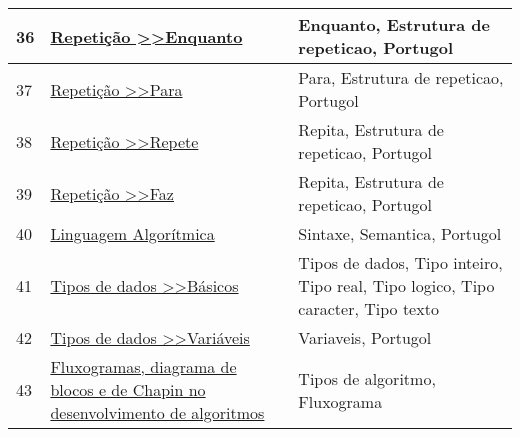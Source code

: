 \begin{longtable}{| p{} | p{} | p{} |}
36  & \href{http://www.dei.estt.ipt.pt/portugol/node/27}{\color{blue} Repetição \textgreater{}\textgreater Enquanto                                       } & Enquanto, Estrutura de repeticao, Portugol                                                                                                        \\ \hline
37  & \href{http://www.dei.estt.ipt.pt/portugol/node/28}{\color{blue} Repetição \textgreater{}\textgreater Para                                           } & Para, Estrutura de repeticao, Portugol                                                                                                            \\ \hline
38  & \href{http://www.dei.estt.ipt.pt/portugol/node/29}{\color{blue} Repetição \textgreater{}\textgreater Repete                                         } & Repita, Estrutura de repeticao, Portugol                                                                                                          \\ \hline
39  & \href{http://www.dei.estt.ipt.pt/portugol/node/30}{\color{blue} Repetição \textgreater{}\textgreater Faz                                            } & Repita, Estrutura de repeticao, Portugol                                                                                                          \\ \hline
40  & \href{http://www.dei.estt.ipt.pt/portugol/node/6}{\color{blue} Linguagem Algorítmica                                                               } & Sintaxe, Semantica, Portugol                                                                                                                      \\ \hline
41  & \href{http://www.dei.estt.ipt.pt/portugol/node/8}{\color{blue} Tipos de dados \textgreater{}\textgreater Básicos                                   } & Tipos de dados, Tipo inteiro, Tipo real, Tipo logico, Tipo caracter, Tipo texto                                                                   \\ \hline
42  & \href{http://www.dei.estt.ipt.pt/portugol/node/9}{\color{blue} Tipos de dados \textgreater{}\textgreater Variáveis                                 } & Variaveis, Portugol                                                                                                                               \\ \hline
43  & \href{http://www.devmedia.com.br/fluxogramas-diagrama-de-blocos-e-de-chapin-no-desenvolvimento-de-algoritmos/28550}{\color{blue} Fluxogramas, diagrama de blocos e de Chapin no desenvolvimento de algoritmos        } & Tipos de algoritmo, Fluxograma                                                                                                                    \\ \hline

\end{longtable}

